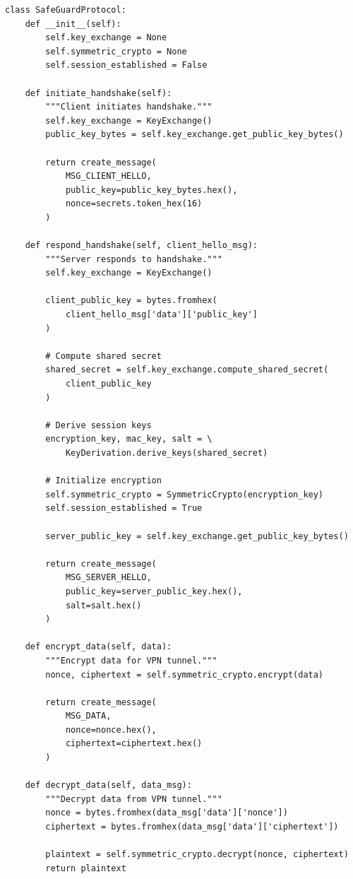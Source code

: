 \documentclass[12pt,a4paper]{article}
\begin{document}
\begin{lstlisting}[style=pythonstyle, caption={SafeGuard protocol class}]
class SafeGuardProtocol:
    def __init__(self):
        self.key_exchange = None
        self.symmetric_crypto = None
        self.session_established = False
    
    def initiate_handshake(self):
        """Client initiates handshake."""
        self.key_exchange = KeyExchange()
        public_key_bytes = self.key_exchange.get_public_key_bytes()
        
        return create_message(
            MSG_CLIENT_HELLO,
            public_key=public_key_bytes.hex(),
            nonce=secrets.token_hex(16)
        )
    
    def respond_handshake(self, client_hello_msg):
        """Server responds to handshake."""
        self.key_exchange = KeyExchange()
        
        client_public_key = bytes.fromhex(
            client_hello_msg['data']['public_key']
        )
        
        # Compute shared secret
        shared_secret = self.key_exchange.compute_shared_secret(
            client_public_key
        )
        
        # Derive session keys
        encryption_key, mac_key, salt = \
            KeyDerivation.derive_keys(shared_secret)
        
        # Initialize encryption
        self.symmetric_crypto = SymmetricCrypto(encryption_key)
        self.session_established = True
        
        server_public_key = self.key_exchange.get_public_key_bytes()
        
        return create_message(
            MSG_SERVER_HELLO,
            public_key=server_public_key.hex(),
            salt=salt.hex()
        )
    
    def encrypt_data(self, data):
        """Encrypt data for VPN tunnel."""
        nonce, ciphertext = self.symmetric_crypto.encrypt(data)
        
        return create_message(
            MSG_DATA,
            nonce=nonce.hex(),
            ciphertext=ciphertext.hex()
        )
    
    def decrypt_data(self, data_msg):
        """Decrypt data from VPN tunnel."""
        nonce = bytes.fromhex(data_msg['data']['nonce'])
        ciphertext = bytes.fromhex(data_msg['data']['ciphertext'])
        
        plaintext = self.symmetric_crypto.decrypt(nonce, ciphertext)
        return plaintext
\end{lstlisting}
\end{document}
